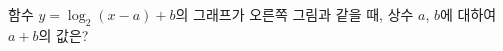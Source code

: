\noindent\begin{minipage}[t]{0.58\linewidth}\vspace{0pt}\raggedright 함수 $y=\log_2 (x-a)+b$의 그래프가 오른쪽 그림과 같을 때, 상수 $a$, $b$에 대하여 $a+b$의 값은? \end{minipage}\hfill\begin{minipage}[t]{0.4\linewidth}\vspace{0pt}\centering \resizebox{\ifdim\width>\linewidth\linewidth\else\width\fi}{!}{}\end{minipage}\par
{}
